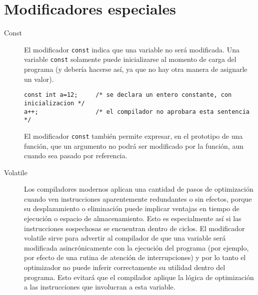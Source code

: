 \section{Modificadores especiales}

\begin{description}
	\item[Const] 
	El modificador \lstinline{const} indica que una variable no será modificada. Una variable \lstinline{const} solamente puede inicializarse al
momento de carga del programa (y debería hacerse así, ya que no hay otra manera de asignarle un
valor).
\begin{lstlisting}
const int a=12; 	/* se declara un entero constante, con inicializacion */
a++;				/* el compilador no aprobara esta sentencia */
\end{lstlisting}
El modificador \lstinline{const} también permite expresar, en el prototipo de una función, que un argumento no
podrá ser modificado por la función, aun cuando sea pasado por referencia.
\item [Volatile]
Los compiladores modernos aplican una cantidad de pasos de optimización cuando ven instrucciones
aparentemente redundantes o sin efectos, porque su desplazamiento o eliminación puede implicar
ventajas en tiempo de ejecución o espacio de almacenamiento. Esto es especialmente así si las
instrucciones sospechosas se encuentran dentro de ciclos. El modificador volatile sirve para advertir al
compilador de que una variable será modificada asincrónicamente con la ejecución del programa (por
ejemplo, por efecto de una rutina de atención de interrupciones) y por lo tanto el optimizador no puede
inferir correctamente su utilidad dentro del programa. Esto evitará que el compilador aplique la lógica
de optimización a las instrucciones que involucran a esta variable.
\end{description}

